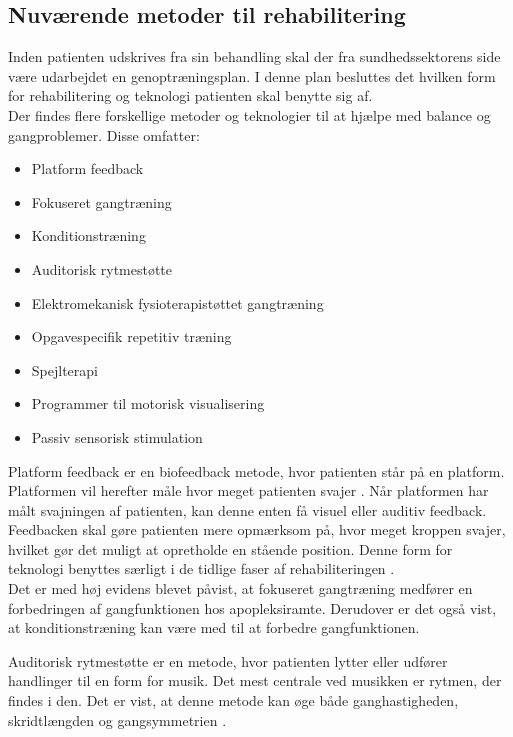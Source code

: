 \subsection{Nuværende metoder til rehabilitering}

Inden patienten udskrives fra sin behandling skal der fra sundhedssektorens side være udarbejdet en genoptræningsplan. I denne plan besluttes det hvilken form for rehabilitering og teknologi patienten skal benytte sig af. \cite{Sundhedsstyrelsen2011a} \\
Der findes flere forskellige metoder og teknologier til at hjælpe med balance og gangproblemer. Disse omfatter: \cite{Sundhedsstyrelsen2011a}  

\begin{itemize}
\item Platform feedback
\item Fokuseret gangtræning
\item Konditionstræning
\item Auditorisk rytmestøtte
\item Elektromekanisk fysioterapistøttet gangtræning
\item Opgavespecifik repetitiv træning
\item Spejlterapi
\item Programmer til motorisk visualisering
\item Passiv sensorisk stimulation
\end{itemize}

Platform feedback er en biofeedback metode, hvor patienten står på en platform. Platformen vil herefter måle hvor meget patienten svajer . Når platformen har målt svajningen af patienten, kan denne enten få visuel eller auditiv feedback. Feedbacken skal gøre patienten mere opmærksom på, hvor meget kroppen svajer, hvilket gør det muligt at opretholde en stående position. \cite{Barclay-Goddard2004}
Denne form for teknologi benyttes særligt i de tidlige faser af rehabiliteringen \cite{Sundhedsstyrelsen2011a}. \\
Det er med høj evidens blevet påvist, at fokuseret gangtræning medfører en forbedringen af gangfunktionen hos apopleksiramte\cite{Sundhedsstyrelsen2010}. Derudover er det også vist, at konditionstræning kan være med til at forbedre gangfunktionen\cite{Sundhedsstyrelsen2010}.

Auditorisk rytmestøtte er en metode, hvor patienten lytter eller udfører handlinger til en form for musik. Det mest centrale ved musikken er rytmen, der findes i den. \cite{Bradt2010} Det er vist, at denne metode kan øge både ganghastigheden, skridtlængden og gangsymmetrien \cite{Sundhedsstyrelsen2010}.

